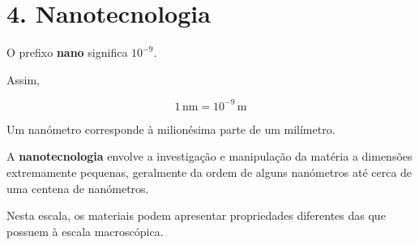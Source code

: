 \documentclass[11pt,a4paper]{article}
\begin{document}
	
	\newpage
	
	\section*{\textcolor{eugreen}{4. Nanotecnologia}}
	
	\begin{stem}
		
		O prefixo \textbf{nano} significa \(10^{-9}\).
		
		Assim,
		
		\[
		\boxed{
			1\,\mathrm{nm}=10^{-9}\,\mathrm{m}
		}
		\]
		
		Um nanómetro corresponde à milionésima parte de um milímetro.
		
		A \textbf{nanotecnologia} envolve a investigação e manipulação da matéria
		a dimensões extremamente pequenas, geralmente da ordem de alguns
		nanómetros até cerca de uma centena de nanómetros.
		
		Nesta escala, os materiais podem apresentar propriedades diferentes das
		que possuem à escala macroscópica.
		
	\end{stem}
	
	
\end{document}
